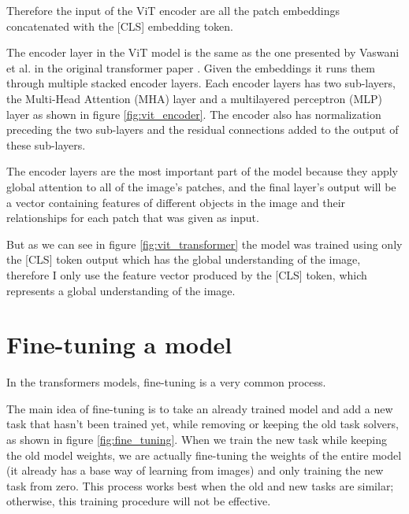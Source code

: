 \documentclass{report}[12pt, a4paper]
\begin{document}
Therefore the input of the ViT encoder are all the patch embeddings concatenated with the [CLS] embedding token.

The encoder layer in the ViT model is the same as the one presented by Vaswani et al. in the original transformer paper \cite{attention_is_all_you_need}. Given the embeddings it runs them through multiple stacked encoder layers. Each encoder layers has two sub-layers, the Multi-Head Attention (MHA) layer and a multilayered perceptron (MLP) layer as shown in figure \ref{fig:vit_encoder}. The encoder also has normalization preceding the two sub-layers and the residual connections added to the output of these sub-layers.

The encoder layers are the most important part of the model because they apply global attention to all of the image's patches, and the final layer's output will be a vector containing features of different objects in the image and their relationships for each patch that was given as input.

But as we can see in figure \ref{fig:vit_transformer} the model was trained using only the [CLS] token output which has the global understanding of the image, therefore I only use the feature vector produced by the [CLS] token, which represents a global understanding of the image.

\section{Fine-tuning a model}

In the transformers models, fine-tuning is a very common process.


The main idea of fine-tuning is to take an already trained model and add a new task that hasn't been trained yet, while removing or keeping the old task solvers, as shown in figure \ref{fig:fine_tuning}. When we train the new task while keeping the old model weights, we are actually fine-tuning the weights of the entire model (it already has a base way of learning from images) and only training the new task from zero. This process works best when the old and new tasks are similar; otherwise, this training procedure will not be effective.
\end{document}
